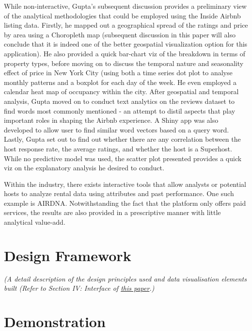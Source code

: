 \documentclass{acm_proc_article-sp}
\begin{document}
While non-interactive, Gupta's subsequent discussion provides a
preliminary view of the analytical methodologies that could be employed
using the Inside Airbnb listing data. Firstly, he mapped out a
geographical spread of the ratings and price by area using a Choropleth
map (subsequent discussion in this paper will also conclude that it is
indeed one of the better geospatial visualization option for this
application). He also provided a quick bar-chart viz of the breakdown in
terms of property types, before moving on to discuss the temporal nature
and seasonality effect of price in New York City (using both a time
series dot plot to analyse monthly patterns and a boxplot for each day
of the week. He even employed a calendar heat map of occupancy within
the city. After geospatial and temporal analysis, Gupta moved on to
conduct text analytics on the reviews dataset to find words most
commonly mentioned - an attempt to distil aspects that play important
roles in shaping the Airbnb experience. A Shiny app was also developed
to allow user to find similar word vectors based on a query word.
Lastly, Gupta set out to find out whether there are any correlation
between the host response rate, the average ratings, and whether the
host is a Superhost. While no predictive model was used, the scatter
plot presented provides a quick viz on the explanatory analysis he
desired to conduct.

Within the industry, there exists interactive tools that allow analysts
or potential hosts to analyze rental data using attributes and past
performance. One such example is AIRDNA. Notwithstanding the fact that
the platform only offers paid services, the results are also provided in
a prescriptive manner with little analytical value-add.

\hypertarget{design-framework}{%
\section{Design Framework}\label{design-framework}}

\emph{(A detail description of the design principles used and data
visualisation elements built (Refer to Section IV: Interface of
\href{https://ink.library.smu.edu.sg/cgi/viewcontent.cgi?article=2760\&context=sis_research}{this
paper}.)}

\hypertarget{demonstration}{%
\section{Demonstration}\label{demonstration}}
\end{document}

